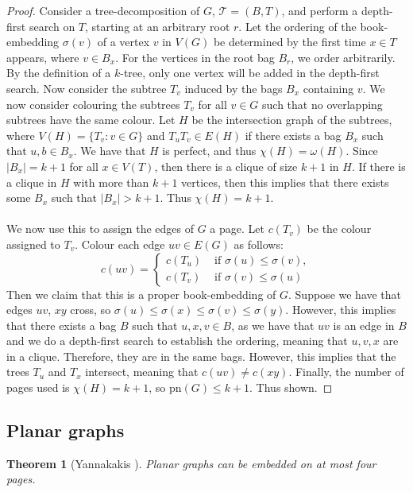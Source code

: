 \documentclass[]{report}
\newcommand{\tree}{\mathcal{T}}
\newcommand{\pn}{\text{pn}}
\newtheorem{theorem}{Theorem}
\theoremstyle{definition}
\numberwithin{theorem}{section}
\numberwithin{equation}{section}
\begin{document}
\begin{proof}
	Consider a tree-decomposition of $G$, $\tree = (B, T)$, and perform a depth-first search on $T$, starting at an arbitrary root $r$. Let the ordering of the book-embedding $\sigma(v)$ of a vertex $v$ in $V(G)$ be determined by the first time $x \in T$ appears, where $v \in B_x$. For the vertices in the root bag $B_r$, we order arbitrarily. By the definition of a $k$-tree, only one vertex will be added in the depth-first search. Now consider the subtree $T_v$ induced by the bags $B_x$ containing $v$. We now consider colouring the subtrees $T_v$ for all $v \in G$ such that no overlapping subtrees have the same colour. Let $H$ be the intersection graph of the subtrees, where $V(H) = \lbrace T_v : v \in G \rbrace$ and $T_u T_v \in E(H)$ if there exists a bag $B_x$ such that $u, b \in B_x$. We have that $H$ is perfect, and thus $\chi(H) = \omega(H)$. Since $|B_x| = k + 1$ for all $x \in V(T)$, then there is a clique of size $k + 1$ in $H$. If there is a clique in $H$ with more than $k+ 1$ vertices, then this implies that there exists some $B_x$ such that $|B_x| > k + 1$. Thus $\chi(H) = k + 1$. 
	\paragraph{}
	We now use this to assign the edges of $G$ a page. Let $c(T_v)$ be the colour assigned to $T_v$. Colour each edge $uv \in E(G)$ as follows:
	\begin{equation}
		c(uv) = 
		\begin{cases}
			c(T_u) &\text{ if } \sigma(u) \leq \sigma(v),\\
			c(T_v) &\text{ if } \sigma(v) \leq \sigma(u)
		\end{cases}
	\end{equation}
	Then we claim that this is a proper book-embedding of $G$. Suppose we have that edges $uv$, $xy$ cross, so $\sigma(u) \leq \sigma(x) \leq \sigma(v) \leq \sigma(y)$. However, this implies that there exists a bag $B$ such that $u, x, v \in B$, as we have that $uv$ is an edge in $B$ and we do a depth-first search to establish the ordering, meaning that $u, v, x$ are in a clique. Therefore, they are in the same bags. However, this implies that the trees $T_u$ and $T_x$ intersect, meaning that $c(uv) \neq c(xy)$. Finally, the number of pages used is $\chi(H) = k + 1$, so $\pn(G) \leq k + 1$. Thus shown.
\end{proof}

\subsection{Planar graphs}\label{ssec:Planar_Graphs}
\begin{theorem}[Yannakakis \cite{yannakakisEmbeddingPlanarGraphs1989b}] \label{thm:4Pages_Planar}
	Planar graphs can be embedded on at most four pages.
\end{theorem}
\end{document}
